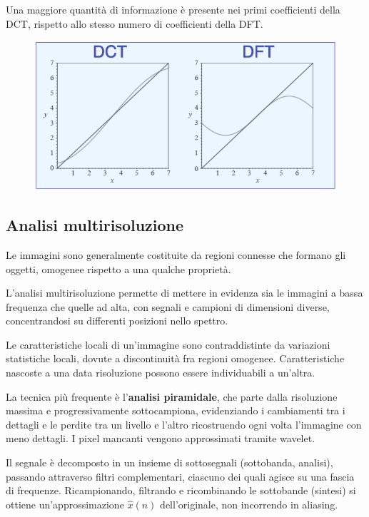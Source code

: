 Una maggiore quantità di informazione è presente nei primi coefficienti della DCT, rispetto allo stesso numero di coefficienti della DFT.

\begin{figure}[h]
	\centering
	\includegraphics[scale=0.27]{Lezioni/Immagini/dctdft}
\end{figure}

\subsection{Analisi multirisoluzione}
Le immagini sono generalmente costituite da regioni connesse che formano gli oggetti, omogenee rispetto a una qualche proprietà.

L'analisi multirisoluzione permette di mettere in evidenza sia le immagini a bassa frequenza che quelle ad alta, con segnali e campioni di dimensioni diverse, concentrandosi su differenti posizioni nello spettro. 

Le caratteristiche locali di un'immagine sono contraddistinte da variazioni statistiche locali, dovute a discontinuità fra regioni omogenee. Caratteristiche nascoste a una data risoluzione possono essere individuabili a un'altra.

La tecnica più frequente è l'\textbf{analisi piramidale}, che parte dalla risoluzione massima e progressivamente sottocampiona, evidenziando i cambiamenti tra i dettagli e le perdite tra un livello e l'altro ricostruendo ogni volta l'immagine con meno dettagli. I pixel mancanti vengono approssimati tramite wavelet.

Il segnale è decomposto in un insieme di sottosegnali (sottobanda, analisi), passando attraverso filtri complementari, ciascuno dei quali agisce su una fascia di frequenze. Ricampionando, filtrando e ricombinando le sottobande (sintesi) si ottiene un'approssimazione $\hat{x}(n)$ dell'originale, non incorrendo in aliasing. 

